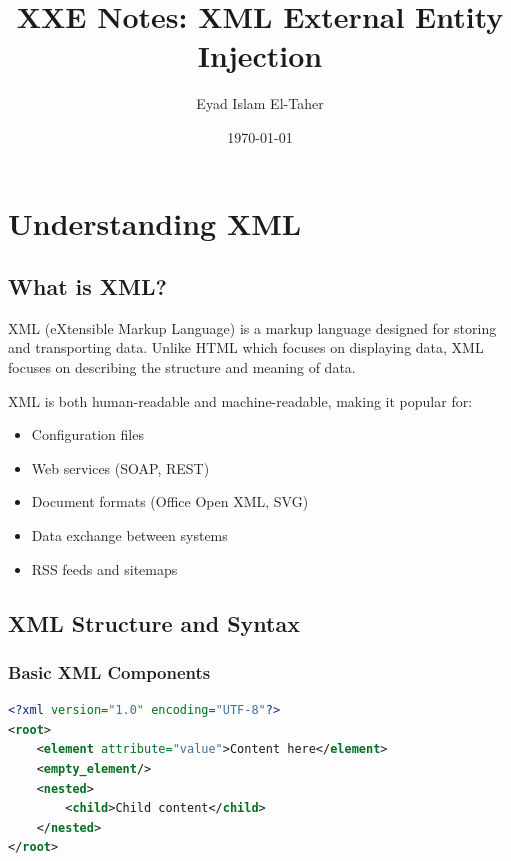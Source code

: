\documentclass{article}
\title{XXE Notes: XML External Entity Injection}
\author{Eyad Islam El-Taher}
\date{\today}
\begin{document}
\maketitle



\section{Understanding XML}

\subsection{What is XML?}
XML (eXtensible Markup Language) is a markup language designed for storing and transporting data. Unlike HTML which focuses on displaying data, XML focuses on describing the structure and meaning of data.

\begin{infobox}
XML is both human-readable and machine-readable, making it popular for:
\begin{itemize}
    \item Configuration files
    \item Web services (SOAP, REST)
    \item Document formats (Office Open XML, SVG)
    \item Data exchange between systems
    \item RSS feeds and sitemaps
\end{itemize}
\end{infobox}

\subsection{XML Structure and Syntax}

\subsubsection{Basic XML Components}
\begin{lstlisting}[language=XML, caption=Basic XML Structure]
<?xml version="1.0" encoding="UTF-8"?>
<root>
    <element attribute="value">Content here</element>
    <empty_element/>
    <nested>
        <child>Child content</child>
    </nested>
</root>
\end{lstlisting}
\end{document}

